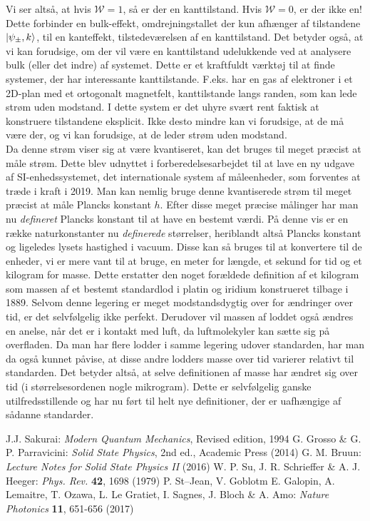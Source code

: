 \documentclass[11pt, a4paper]{article}
\begin{document}
Vi ser altså, at hvis $\mathcal{W} = 1$, så er der en kanttilstand. Hvis $\mathcal{W} = 0$, er der ikke en! Dette forbinder en bulk-effekt, omdrejningstallet der kun afhænger af tilstandene $\ket{\psi_\pm, k}$, til en kanteffekt, tilstedeværelsen af en kanttilstand. Det betyder også, at vi kan forudsige, om der vil være en kanttilstand udelukkende ved at analysere bulk (eller det indre) af systemet. Dette er et kraftfuldt værktøj til at finde systemer, der har interessante kanttilstande. F.eks. har en gas af elektroner i et 2D-plan med et ortogonalt magnetfelt, kanttilstande langs randen, som kan lede strøm uden modstand.  I dette system er det uhyre svært rent faktisk at konstruere tilstandene eksplicit. Ikke desto mindre kan vi forudsige, at de må være der, og vi kan forudsige, at de leder strøm uden modstand. \\


Da denne strøm viser sig at være kvantiseret, kan det bruges til meget præcist at måle strøm. Dette blev udnyttet i forberedelsesarbejdet til at lave en ny udgave af SI-enhedssystemet, det internationale system af måleenheder, som forventes at træde i kraft i 2019. Man kan nemlig bruge denne kvantiserede strøm til meget præcist at måle Plancks konstant $h$. Efter disse meget præcise målinger har man nu \textit{defineret} Plancks konstant til at have en bestemt værdi. På denne vis er en række naturkonstanter nu \textit{definerede} størrelser, heriblandt altså Plancks konstant og ligeledes lysets hastighed i vacuum. Disse kan så bruges til at konvertere til de enheder, vi er mere vant til at bruge, en meter for længde, et sekund for tid og et kilogram for masse. Dette erstatter den noget forældede definition af et kilogram som massen af et bestemt standardlod i platin og iridium konstrueret tilbage i 1889. Selvom denne legering er meget modstandsdygtig over for ændringer over tid, er det selvfølgelig ikke perfekt. Derudover vil massen af loddet også ændres en anelse, når det er i kontakt med luft, da luftmolekyler kan sætte sig på overfladen. Da man har flere lodder i samme legering udover standarden, har man da også kunnet påvise, at disse andre lodders masse over tid varierer relativt til standarden. Det betyder altså, at selve definitionen af masse har ændret sig over tid (i størrelsesordenen nogle mikrogram). Dette er selvfølgelig ganske utilfredsstillende og har nu ført til helt nye definitioner, der er uafhængige af sådanne standarder. 

\newpage
\begin{thebibliography}{9}
   J.J. Sakurai: {\it Modern Quantum Mechanics}, Revised edition, 1994
    G. Grosso \& G. P.  Parravicini: {\it Solid State Physics}, 2nd ed.,
    Academic Press (2014)
   G. M. Bruun: {\it Lecture Notes for Solid State Physics II} (2016)
   W. P. Su, J. R. Schrieffer \& A. J. Heeger: {\it Phys. Rev.} \textbf{42}, 1698 (1979) 
   P. St--Jean, V. Goblotm E. Galopin, A. Lemaitre, T. Ozawa, L. Le Gratiet, I. Sagnes, J. Bloch \& A. Amo: {\it Nature Photonics} \textbf{11}, 651-656 (2017)
\end{thebibliography}
\end{document}
